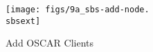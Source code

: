 

%
%
%


\begin{figure}[htbp]
  \begin{center}
    \texttt{[image: figs/9a\_sbs-add-node.\\sbsext]}
    \caption{Add OSCAR Clients}
    \label{fig:sbs-add-node1}
  \end{center}
\end{figure}




